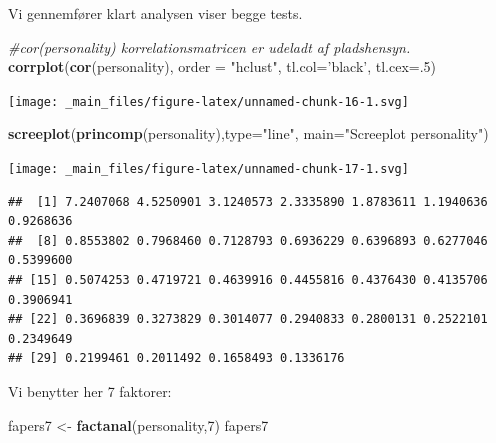 \documentclass[]{book}
\newenvironment{Shaded}{\begin{snugshade}}{\end{snugshade}}
\newcommand{\CommentTok}[1]{\textcolor[rgb]{0.56,0.35,0.01}{\textit{#1}}}
\newcommand{\DataTypeTok}[1]{\textcolor[rgb]{0.13,0.29,0.53}{#1}}
\newcommand{\DecValTok}[1]{\textcolor[rgb]{0.00,0.00,0.81}{#1}}
\newcommand{\KeywordTok}[1]{\textcolor[rgb]{0.13,0.29,0.53}{\textbf{#1}}}
\newcommand{\NormalTok}[1]{#1}
\newcommand{\OperatorTok}[1]{\textcolor[rgb]{0.81,0.36,0.00}{\textbf{#1}}}
\newcommand{\StringTok}[1]{\textcolor[rgb]{0.31,0.60,0.02}{#1}}
\begin{document}
Vi gennemfører klart analysen viser begge tests.

\begin{Shaded}
\begin{Highlighting}[]
\CommentTok{#cor(personality) korrelationsmatricen er udeladt af pladshensyn.}
\KeywordTok{corrplot}\NormalTok{(}\KeywordTok{cor}\NormalTok{(personality), }\DataTypeTok{order =} \StringTok{"hclust"}\NormalTok{, }\DataTypeTok{tl.col=}\StringTok{'black'}\NormalTok{, }\DataTypeTok{tl.cex=}\NormalTok{.}\DecValTok{5}\NormalTok{)}
\end{Highlighting}
\end{Shaded}

\texttt{[image: \_main\_files/figure-latex/unnamed-chunk-16-1.svg]}

\begin{Shaded}
\begin{Highlighting}[]
\KeywordTok{screeplot}\NormalTok{(}\KeywordTok{princomp}\NormalTok{(personality),}\DataTypeTok{type=}\StringTok{"line"}\NormalTok{, }\DataTypeTok{main=}\StringTok{"Screeplot personality"}\NormalTok{)}
\end{Highlighting}
\end{Shaded}

\texttt{[image: \_main\_files/figure-latex/unnamed-chunk-17-1.svg]}

\begin{Shaded}
\end{Shaded}

\begin{verbatim}
##  [1] 7.2407068 4.5250901 3.1240573 2.3335890 1.8783611 1.1940636 0.9268636
##  [8] 0.8553802 0.7968460 0.7128793 0.6936229 0.6396893 0.6277046 0.5399600
## [15] 0.5074253 0.4719721 0.4639916 0.4455816 0.4376430 0.4135706 0.3906941
## [22] 0.3696839 0.3273829 0.3014077 0.2940833 0.2800131 0.2522101 0.2349649
## [29] 0.2199461 0.2011492 0.1658493 0.1336176
\end{verbatim}

Vi benytter her 7 faktorer:

\begin{Shaded}
\begin{Highlighting}[]
\NormalTok{fapers7 <-}\StringTok{ }\KeywordTok{factanal}\NormalTok{(personality,}\DecValTok{7}\NormalTok{)}
\NormalTok{fapers7}
\end{Highlighting}
\end{Shaded}
\end{document}
